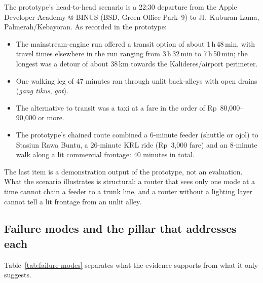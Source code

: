 \documentclass[11pt,a4paper]{article}
\begin{document}
The prototype's head-to-head scenario is a 22:30 departure from the Apple Developer Academy @ BINUS
(BSD, Green Office Park~9) to Jl.\ Kuburan Lama, Palmerah/Kebayoran. As recorded in the prototype:

\begin{itemize}
  \item The mainstream-engine run offered a transit option of about 1\,h\,48\,min, with travel times
    elsewhere in the run ranging from 3\,h\,32\,min to 7\,h\,50\,min; the longest was a detour of about
    38\,km towards the Kalideres/airport perimeter.
  \item One walking leg of 47 minutes ran through unlit back-alleys with open drains (\emph{gang
    tikus}, \emph{got}).
  \item The alternative to transit was a taxi at a fare in the order of Rp~80,000--90,000 or more.
  \item The prototype's chained route combined a 6-minute feeder (shuttle or ojol) to Stasiun Rawa
    Buntu, a 26-minute KRL ride (Rp~3,000 fare) and an 8-minute walk along a lit commercial frontage:
    40 minutes in total.
\end{itemize}

The last item is a demonstration output of the prototype, not an evaluation. What the scenario
illustrates is structural: a router that sees only one mode at a time cannot chain a feeder to a
trunk line, and a router without a lighting layer cannot tell a lit frontage from an unlit alley.

\subsection{Failure modes and the pillar that addresses each}

Table~\ref{tab:failure-modes} separates what the evidence supports from what it only suggests.
\end{document}
